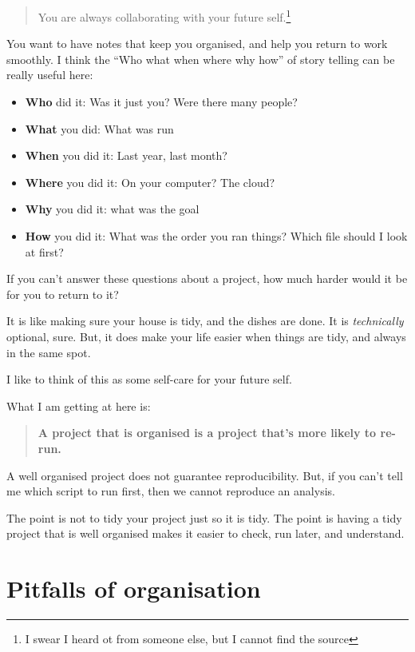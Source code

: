 \documentclass[
  letterpaper,
  justified,
  a4paper]{tufte-book}
\providecommand{\tightlist}{%
  \setlength{\itemsep}{0pt}\setlength{\parskip}{0pt}}
\providecommand{\tightlist}{%
  \setlength{\itemsep}{0pt}\setlength{\parskip}{0pt}}
\begin{document}
\begin{quote}
You are always collaborating with your future self.\footnote{I swear I
  heard ot from someone else, but I cannot find the source}
\end{quote}

You want to have notes that keep you organised, and help you return to
work smoothly. I think the ``Who what when where why how'' of story
telling can be really useful here:

\begin{itemize}
\tightlist
\item
  \textbf{Who} did it: Was it just you? Were there many people?
\item
  \textbf{What} you did: What was run
\item
  \textbf{When} you did it: Last year, last month?
\item
  \textbf{Where} you did it: On your computer? The cloud?
\item
  \textbf{Why} you did it: what was the goal
\item
  \textbf{How} you did it: What was the order you ran things? Which file
  should I look at first?
\end{itemize}

If you can't answer these questions about a project, how much harder
would it be for you to return to it?

It is like making sure your house is tidy, and the dishes are done. It
is \emph{technically} optional, sure. But, it does make your life easier
when things are tidy, and always in the same spot.

I like to think of this as some self-care for your future self.

What I am getting at here is:

\begin{quote}
\textbf{A project that is organised is a project that's more likely to
re-run.}
\end{quote}

A well organised project does not guarantee reproducibility. But, if you
can't tell me which script to run first, then we cannot reproduce an
analysis.

The point is not to tidy your project just so it is tidy. The point is
having a tidy project that is well organised makes it easier to check,
run later, and understand.


\chapter{Pitfalls of organisation}\label{pitfalls-of-organisation}
\end{document}
